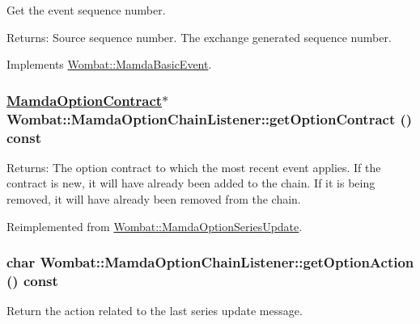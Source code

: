 Get the event sequence number. 

\begin{Desc}
\item[Returns:]Source sequence number. The exchange generated sequence number. \end{Desc}


Implements \hyperlink{classWombat_1_1MamdaBasicEvent_1fd845d48e95b4ee3beafc72d1ac2adf}{Wombat::Mamda\-Basic\-Event}.\hypertarget{classWombat_1_1MamdaOptionChainListener_af867698910e7291e62db6ecc8e47799}{
\subsubsection[getOptionContract]{\setlength{\rightskip}{0pt plus 5cm}\hyperlink{classWombat_1_1MamdaOptionContract}{Mamda\-Option\-Contract}$\ast$ Wombat::Mamda\-Option\-Chain\-Listener::get\-Option\-Contract () const}}
\label{classWombat_1_1MamdaOptionChainListener_af867698910e7291e62db6ecc8e47799}


\begin{Desc}
\item[Returns:]The option contract to which the most recent event applies. If the contract is new, it will have already been added to the chain. If it is being removed, it will have already been removed from the chain. \end{Desc}


Reimplemented from \hyperlink{classWombat_1_1MamdaOptionSeriesUpdate_9aa226dbd2c289c60828ac1279d8777a}{Wombat::Mamda\-Option\-Series\-Update}.\hypertarget{classWombat_1_1MamdaOptionChainListener_b1606745ac13faa4da7d9318705491a6}{
\subsubsection[getOptionAction]{\setlength{\rightskip}{0pt plus 5cm}char Wombat::Mamda\-Option\-Chain\-Listener::get\-Option\-Action () const}}
\label{classWombat_1_1MamdaOptionChainListener_b1606745ac13faa4da7d9318705491a6}


Return the action related to the last series update message. 


